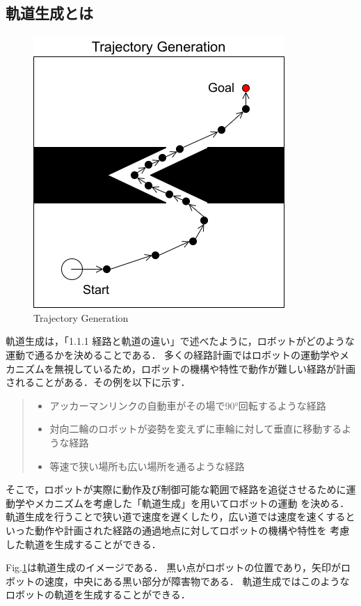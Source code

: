 
\subsection{軌道生成とは}

\begin{figure}[hbtp]
  \centering
 \includegraphics[keepaspectratio, scale=0.8]
      {images/png/TrajectoryGeneration.drawio.png}
 \caption{Trajectory Generation}
 \label{Fig:TrajectoryGeneration}
\end{figure}

軌道生成は，「1.1.1 経路と軌道の違い」で述べたように，ロボットがどのような運動で通るかを決めることである．
多くの経路計画ではロボットの運動学やメカニズムを無視しているため，ロボットの機構や特性で動作が難しい経路が計画されることがある．その例を以下に示す．
\begin{quote}
     \begin{itemize}
      \item アッカーマンリンクの自動車がその場で90°回転するような経路
      \item 対向二輪のロボットが姿勢を変えずに車輪に対して垂直に移動するような経路
      \item 等速で狭い場所も広い場所を通るような経路
     \end{itemize}
\end{quote}
そこで，ロボットが実際に動作及び制御可能な範囲で経路を追従させるために運動学やメカニズムを考慮した「軌道生成」を用いてロボットの運動
を決める．軌道生成を行うことで狭い道で速度を遅くしたり，広い道では速度を速くするといった動作や計画された経路の通過地点に対してロボットの機構や特性を
考慮した軌道を生成することができる．

Fig.\ref{Fig:TrajectoryGeneration}は軌道生成のイメージである．
黒い点がロボットの位置であり，矢印がロボットの速度，中央にある黒い部分が障害物である．
軌道生成ではこのようなロボットの軌道を生成することができる．
\newpage